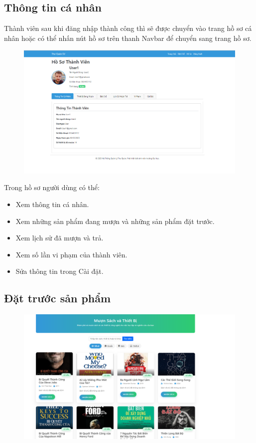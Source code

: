 \documentclass{article}
\begin{document}
\subsection{Thông tin cá nhân}
Thành viên sau khi đăng nhập thành công thì sẽ được chuyển vào trang hồ sơ cá nhân hoặc có thể nhấn nút hồ sơ trên thanh Navbar để chuyển sang trang hồ sơ.
\begin{figure} [H]
    \centering
    \includegraphics[width=1\linewidth]{images//Website/cn ttcn.png}
    \label{fig:enter-label}
\end{figure}

Trong hồ sơ người dùng có thể:
\begin{itemize}
    \item Xem thông tin cá nhân.
    \item Xem những sản phẩm đang mượn và những sản phẩm đặt trước.
    \item Xem lịch sử đã mượn và trả.
    \item Xem số lần vi phạm của thành viên.
    \item Sửa thông tin trong Cài đặt.
\end{itemize}

\subsection{Đặt trước sản phẩm}
\begin{figure} [H]
    \centering
    \includegraphics[width=1\linewidth]{images//Website/cn đặt sách1.png}
    \label{fig:enter-label}
\end{figure}
\end{document}
